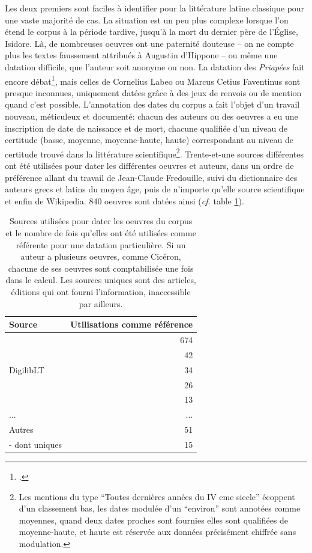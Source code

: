 Les deux premiers sont faciles à identifier pour la littérature latine classique pour une vaste majorité de cas. La situation est un peu plus complexe lorsque l'on étend le corpus à la période tardive, jusqu'à la mort du dernier père de l'Église, Isidore. Là, de nombreuses oeuvres ont une paternité douteuse -- on ne compte plus les textes faussement attribués à Augustin d'Hippone -- ou même une datation difficile, que l'auteur soit anonyme ou non. La datation des \textit{Priapées} fait encore débat\footcite{oconnor_carminis_2019}, mais celles de Cornelius Labeo ou Marcus Cetius Faventinus sont presque inconnues, uniquement datées grâce à des jeux de renvois ou de mention quand c'est possible. L'annotation des dates du corpus a fait l'objet d'un travail nouveau, méticuleux et documenté: chacun des auteurs ou des oeuvres a eu une inscription de date de naissance et de mort, chacune qualifiée d'un niveau de certitude (basse, moyenne, moyenne-haute, haute) correspondant au niveau de certitude trouvé dans la littérature scientifique\footnote{Les mentions du type \enquote{Toutes dernières années du IV eme siecle} écoppent d'un classement bas, les dates modulée d'un \enquote{environ} sont annotées comme moyennes, quand deux dates proches sont fournies elles sont qualifiées de moyenne-haute, et haute est réservée aux données précisément chiffrée sans modulation.}. Trente-et-une sources différentes ont été utilisées pour dater les différentes oeuvres et auteurs, dans un ordre de préférence allant du travail de Jean-Claude Fredouille, suivi du dictionnaire des auteurs grecs et latins du moyen âge, puis de n'importe qu'elle source scientifique et enfin de Wikipedia. 840 oeuvres sont datées ainsi (\textit{cf.} table \ref{tab:chap1:sources-fredouilles}).


\begin{table}[]
    \centering
    \begin{tabularx}{\textwidth}{X|r}
    \toprule
    Source & Utilisations comme référence \\ \midrule
    \cite{zehnacker_litterature_2013} & 674 \\ 
    \cite{noauthor_base_nodate} & 42 \\
    DigilibLT & 34 \\
    \cite{buchwald_dictionnaire_1991} & 26 \\
    \cite{hornblower_oxford_1996} &     13 \\
    ... & ... \\ 
    Autres & 51 \\ 
    - dont uniques & 15 \\\bottomrule
    \end{tabularx}
    \caption{Sources utilisées pour dater les oeuvres du corpus et le nombre de fois qu'elles ont été utilisées comme référente pour une datation particulière. Si un auteur a plusieurs oeuvres, comme Cicéron, chacune de ses oeuvres sont comptabilisée une fois dans le calcul. Les sources uniques sont des articles, éditions qui ont fourni l'information, inaccessible par ailleurs.}
    \label{tab:chap1:sources-fredouilles}
\end{table}

